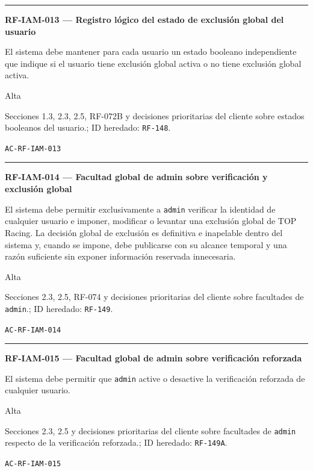 \documentclass[10pt,letterpaper]{article}
\begin{document}
\vspace{0.25em}\hrule\vspace{0.65em}
\noindent\textbf{RF-IAM-013 --- Registro lógico del estado de exclusión global del usuario}\par
\begin{description}[style=nextline,leftmargin=3.15cm,labelwidth=2.8cm,font=\normalfont\bfseries]
\item[Obligación] El sistema debe mantener para cada usuario un estado booleano independiente que indique si el usuario tiene exclusión global activa o no tiene exclusión global activa.
\item[Prioridad] Alta
\item[Procedencia] Secciones 1.3, 2.3, 2.5, RF-072B y decisiones prioritarias del cliente sobre estados booleanos del usuario.; ID heredado: \texttt{RF-148}.
\item[Verificación] \texttt{AC-RF-IAM-013}
\end{description}
\vspace{0.25em}\hrule\vspace{0.65em}
\noindent\textbf{RF-IAM-014 --- Facultad global de admin sobre verificación y exclusión global}\par
\begin{description}[style=nextline,leftmargin=3.15cm,labelwidth=2.8cm,font=\normalfont\bfseries]
\item[Obligación] El sistema debe permitir exclusivamente a \texttt{admin} verificar la identidad de cualquier usuario e imponer, modificar o levantar una exclusión global de TOP Racing. La decisión global de exclusión es definitiva e inapelable dentro del sistema y, cuando se impone, debe publicarse con su alcance temporal y una razón suficiente sin exponer información reservada innecesaria.
\item[Prioridad] Alta
\item[Procedencia] Secciones 2.3, 2.5, RF-074 y decisiones prioritarias del cliente sobre facultades de \texttt{admin}.; ID heredado: \texttt{RF-149}.
\item[Verificación] \texttt{AC-RF-IAM-014}
\end{description}
\vspace{0.25em}\hrule\vspace{0.65em}
\noindent\textbf{RF-IAM-015 --- Facultad global de admin sobre verificación reforzada}\par
\begin{description}[style=nextline,leftmargin=3.15cm,labelwidth=2.8cm,font=\normalfont\bfseries]
\item[Obligación] El sistema debe permitir que \texttt{admin} active o desactive la verificación reforzada de cualquier usuario.
\item[Prioridad] Alta
\item[Procedencia] Secciones 2.3, 2.5 y decisiones prioritarias del cliente sobre facultades de \texttt{admin} respecto de la verificación reforzada.; ID heredado: \texttt{RF-149A}.
\item[Verificación] \texttt{AC-RF-IAM-015}
\end{description}
\end{document}
